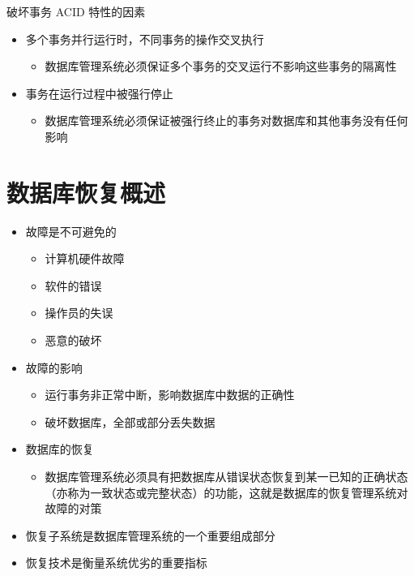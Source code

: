 破坏事务 ACID 特性的因素
\begin{itemize}
    \item 多个事务并行运行时，不同事务的操作交叉执行
    \begin{itemize}
        \item 数据库管理系统必须保证多个事务的交叉运行不影响这些事务的隔离性
    \end{itemize}
    \item 事务在运行过程中被强行停止
    \begin{itemize}
        \item 数据库管理系统必须保证被强行终止的事务对数据库和其他事务没有任何影响
    \end{itemize}
\end{itemize}

\section{数据库恢复概述}
\begin{itemize}
    \item 故障是不可避免的
    \vspace{-0.8em}
	\begin{multicols}{4}
        \begin{itemize}
            \item 计算机硬件故障
            \item 软件的错误
            \item 操作员的失误
            \item 恶意的破坏
        \end{itemize}
	\end{multicols}
	\vspace{-1em}
    \item 故障的影响
    \begin{itemize}
        \item 运行事务非正常中断，影响数据库中数据的正确性 
        \item 破坏数据库，全部或部分丢失数据
    \end{itemize}
    \item 数据库的恢复
    \begin{itemize}
        \item 数据库管理系统必须具有把数据库从错误状态恢复到某一已知的正确状态（亦称为一致状态或完整状态）的功能，这就是数据库的恢复管理系统对故障的对策
    \end{itemize}
    \item 恢复子系统是数据库管理系统的一个重要组成部分
    \item 恢复技术是衡量系统优劣的重要指标
\end{itemize}

